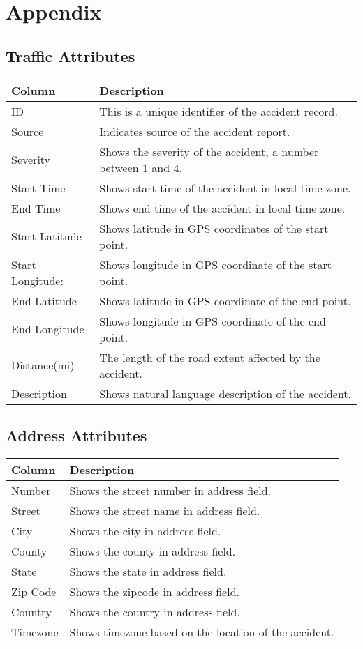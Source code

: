 \appendix
\section{Appendix}
\label{section:appendix}

\subsection{Traffic Attributes}
\label{section:traffic_attrs}

\begin{longtable}[c]{l | l}
    Column & Description \\
    \hline
    ID & This is a unique identifier of the accident record. \\
    Source & Indicates source of the accident report. \\
    Severity & Shows the severity of the accident, a number between 1 and 4. \\
    Start Time & Shows start time of the accident in local time zone. \\
    End Time & Shows end time of the accident in local time zone. \\
    Start Latitude & Shows latitude in GPS coordinates of the start point. \\
    Start Longitude: & Shows longitude in GPS coordinate of the start point. \\
    End Latitude & Shows latitude in GPS coordinate of the end point. \\
    End Longitude & Shows longitude in GPS coordinate of the end point. \\
    Distance(mi) & The length of the road extent affected by the accident. \\
    Description & Shows natural language description of the accident. \\
\end{longtable}

\subsection{Address Attributes}
\label{section:address_attrs}

\begin{longtable}[c]{l | l}
    Column & Description \\
    \hline
    Number & Shows the street number in address field. \\
    Street & Shows the street name in address field. \\
    City & Shows the city in address field. \\
    County & Shows the county in address field. \\
    State & Shows the state in address field. \\
    Zip Code & Shows the zipcode in address field. \\
    Country & Shows the country in address field. \\
    Timezone & Shows timezone based on the location of the accident. \\
\end{longtable}

